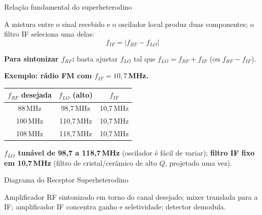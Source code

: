 \begin{frame}{Relação fundamental do superheterodino}

A mistura entre o sinal recebido e o oscilador local produz duas componentes; o filtro IF seleciona uma delas:
\[
\boxed{\;f_{IF} = |f_{RF} - f_{LO}|\;}
\]

\pause
\textbf{Para sintonizar $f_{RF}$:} basta ajustar $f_{LO}$ tal que $f_{LO} = f_{RF} + f_{IF}$ (ou $f_{RF} - f_{IF}$).

\pause
\textbf{Exemplo: rádio FM com $f_{IF} = 10{,}7$\,MHz.}
\begin{center}
\footnotesize
\begin{tabular}{ccc}
\toprule
$f_{RF}$ desejada & $f_{LO}$ (alto) & $f_{IF}$ \\
\midrule
88\,MHz   & 98{,}7\,MHz   & 10{,}7\,MHz \\
100\,MHz  & 110{,}7\,MHz  & 10{,}7\,MHz \\
108\,MHz  & 118{,}7\,MHz  & 10{,}7\,MHz \\
\bottomrule
\end{tabular}
\end{center}

\textbf{$f_{LO}$ tunável de 98,7 a 118,7\,MHz} (oscilador é fácil de variar); \textbf{filtro IF fixo em 10,7\,MHz} (filtro de cristal/cerâmico de alto $Q$, projetado uma vez).

\end{frame}


\begin{frame}{Diagrama do Receptor Superheterodino}

\begin{center}
\end{center}

\small Amplificador RF sintonizado em torno do canal desejado; mixer translada para a IF; amplificador IF concentra ganho e seletividade; detector demodula.

\end{frame}

